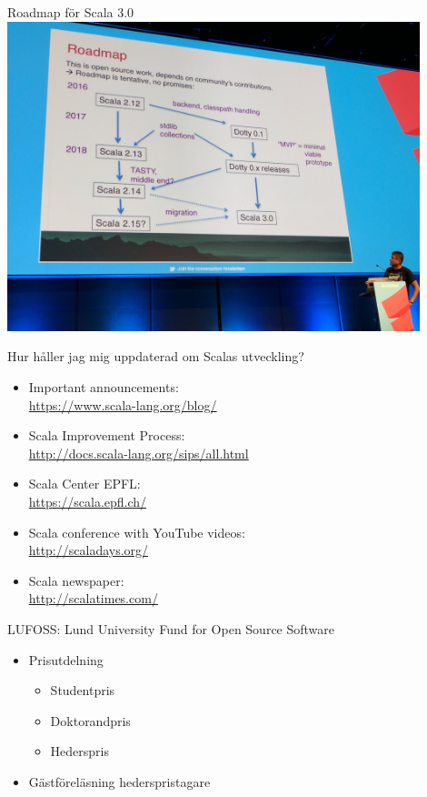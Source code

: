 \begin{Slide}{Roadmap för Scala 3.0}
  \includegraphics[width=0.9\textwidth]{../img/w14/scala-dotty-roadmap-odersky.jpeg}
\end{Slide}




\begin{Slide}{Hur håller jag mig uppdaterad om Scalas utveckling?}
\begin{itemize}
  \item Important announcements: \\\url{https://www.scala-lang.org/blog/}
  \item Scala Improvement Process: \\
  \url{http://docs.scala-lang.org/sips/all.html}
  \item  Scala Center \@ EPFL: \\ \url{https://scala.epfl.ch/}
  \item Scala conference with YouTube videos: \\ \url{http://scaladays.org/}
  \item Scala newspaper: \\\url{http://scalatimes.com/}
\end{itemize}
\end{Slide}





\begin{Slide}{LUFOSS: Lund University Fund for Open Source Software}
\begin{itemize}
  \item Prisutdelning
  \begin{itemize}
    \item Studentpris
    \item Doktorandpris
    \item Hederspris
  \end{itemize}
  \item Gästföreläsning hederspristagare
\end{itemize}
\end{Slide}



